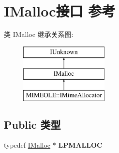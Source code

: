 \hypertarget{interface_i_malloc}{}\section{I\+Malloc接口 参考}
\label{interface_i_malloc}
类 I\+Malloc 继承关系图\+:\begin{figure}[H]
\begin{center}
\leavevmode
\includegraphics[height=3.000000cm]{interface_i_malloc}
\end{center}
\end{figure}
\subsection*{Public 类型}
\begin{DoxyCompactItemize}
\item 
\mbox{\label{interface_i_malloc_a213481f0a91b25e909cd5de418a54bff}} 
typedef \hyperlink{interface_i_malloc}{I\+Malloc} $\ast$ {\bfseries L\+P\+M\+A\+L\+L\+OC}
\end{DoxyCompactItemize}
